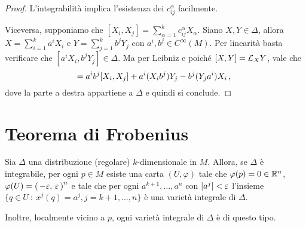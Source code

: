 \begin{proof}
	L'integrabilità implica l'esistenza dei $c_{ij}^\alpha$ facilmente.
	
	Viceversa, supponiamo che $[X_i,X_j]=\sum_{\alpha=1}^kc_{ij}^\alpha X_\alpha$. Siano $X,Y\in\Delta$, allora $X=\sum_{i=1}^ka^iX_i$ e $Y=\sum_{j=1}^kb^jY_j$ con $a^i,b^j\in C^\infty(M)$. Per linearità basta verificare che $[a^iX_i,b^jY_j]\in\Delta$.
	Ma per Leibniz e poiché $[X,Y] = \mathcal L_XY$, vale che \begin{equation*}
		[a^iX_i,b^jY_j] = a^ib^j[X_i,X_j]+a^i(X_ib^j)Y_j-b^j(Y_ja^i)X_i\virgola
	\end{equation*}
	dove la parte a destra appartiene a $\Delta$ e quindi si conclude.
\end{proof}

\section{Teorema di Frobenius}

\begin{theorem}[Frobenius]  \label{thm:Frobenius}
	Sia $\Delta$ una distribuzione (regolare) $k$-dimensionale in $M$. Allora, se $\Delta$ è integrabile, per ogni $p\in M$ esiste una carta $(U,\varphi)$ tale che
	$\varphi(p) = 0\in\mathbb R^n$, $\varphi(U)=\left(\,-\varepsilon,\,\varepsilon\,\right)^n$ e tale che per ogni $a^{k+1},\ldots,a^n$ con $\lvert a^j\rvert<\varepsilon$ l'insieme $\{q\in U\ : \ x^j(q)=a^j, j=k+1,\ldots,n\}$ è una varietà integrale di $\Delta$.
	
	Inoltre, localmente vicino a $p$, ogni varietà integrale di $\Delta$ è di questo tipo.
\end{theorem}

